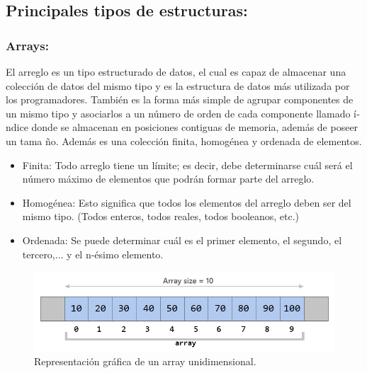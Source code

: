 \documentclass[12pt,letterpaper]{article}
\begin{document}
\subsection{Principales tipos de estructuras:}
\subsubsection{Arrays:}
El arreglo es un tipo estructurado de datos, el cual es capaz de almacenar una colección de datos del mismo tipo y es la estructura de datos más utilizada por los programadores. También es la forma más simple de agrupar componentes de un mismo tipo y asociarlos a un número de orden de cada componente llamado í­ndice donde se almacenan en posiciones contiguas de memoria, además de poseer un tama ño. Además es una colección finita, homogénea y ordenada de elementos.
\begin{itemize}
\item Finita: Todo arreglo tiene un lí­mite; es decir, debe determinarse cuál será el número máximo de elementos que podrán formar parte del arreglo.
\item Homogénea: Esto significa que todos los elementos del arreglo deben ser del mismo tipo. (Todos enteros, todos reales, todos booleanos, etc.)
\item Ordenada: Se puede determinar cuál es el primer elemento, el segundo, el tercero,... y el n-ésimo elemento.
\end{itemize}
\begin{figure}[h]
\begin{center}
\includegraphics[width=12cm]{./Imagenes/array.png}
\caption{Representación gráfica de un array unidimensional.}
\label{rg1}
\end{center}
\end{figure}
\end{document}
